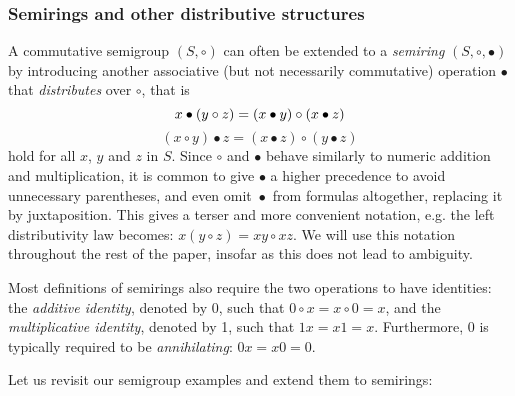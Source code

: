 \documentclass[11pt,letterpaper]{article}
\begin{document}
\subsubsection{Semirings and other distributive structures}

A commutative semigroup $(S, \circ)$ can often be extended to a \emph{semiring}
$(S, \circ, \bullet)$ by introducing another associative (but not necessarily
commutative) operation $\bullet$ that \emph{distributes} over $\circ$, that is
\[
x \bullet (y \circ z) = (x \bullet y) \circ (x \bullet z)\\
\]
\[
(x \circ y) \bullet z = (x \bullet z) \circ (y \bullet z)
\]
hold for all $x$, $y$ and $z$ in $S$. Since $\circ$ and $\bullet$ behave
similarly to numeric addition and multiplication, it is common to give $\bullet$
a higher precedence to avoid unnecessary parentheses, and even omit~$\bullet$~from
formulas altogether, replacing it by juxtaposition. This gives a terser and
more convenient notation, e.g. the left distributivity law becomes:
$x (y \circ z) = x y \circ x z$. We will use this notation throughout the rest
of the paper, insofar as this does not lead to ambiguity.

Most definitions of semirings also require the two operations to have
identities: the \emph{additive identity}, denoted by 0, such that
$0 \circ x = x \circ 0=x$, and the \emph{multiplicative identity}, denoted by 1,
such that $1x=x1=x$. Furthermore, 0 is typically required to be
\emph{annihilating}: $0x=x0=0$.

Let us revisit our semigroup examples and extend them to semirings:
\end{document}
